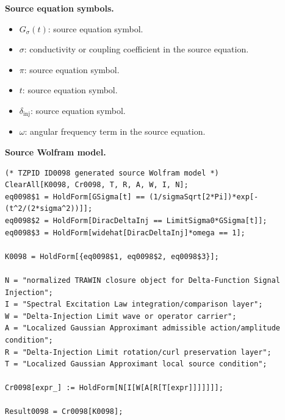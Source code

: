 \begin{minipage}[t]{0.49\linewidth}
\begingroup
\small
\raggedright
\textbf{Source equation symbols.}\par
\begin{itemize}[leftmargin=1.35em,itemsep=1pt,topsep=1pt,parsep=0pt]
    \item $G_{\sigma}(t)$: source equation symbol.
    \item $\sigma$: conductivity or coupling coefficient in the source equation.
    \item $\pi$: source equation symbol.
    \item $t$: source equation symbol.
    \item $\delta_{\mathrm{inj}}$: source equation symbol.
    \item $\omega$: angular frequency term in the source equation.
\end{itemize}
\endgroup
\end{minipage}\hfill
\begin{minipage}[t]{0.47\linewidth}
\begingroup
\scriptsize
\raggedright
\textbf{Source Wolfram model.}\par
\begin{Verbatim}[fontsize=\tiny,breaklines=true,breakanywhere=true]
(* TZPID ID0098 generated source Wolfram model *)
ClearAll[K0098, Cr0098, T, R, A, W, I, N];
eq0098$1 = HoldForm[GSigma[t] == (1/sigmaSqrt[2*Pi])*exp[-(t^2/(2*sigma^2))]];
eq0098$2 = HoldForm[DiracDeltaInj == LimitSigma0*GSigma[t]];
eq0098$3 = HoldForm[widehat[DiracDeltaInj]*omega == 1];

K0098 = HoldForm[{eq0098$1, eq0098$2, eq0098$3}];

N = "normalized TRAWIN closure object for Delta-Function Signal Injection";
I = "Spectral Excitation Law integration/comparison layer";
W = "Delta-Injection Limit wave or operator carrier";
A = "Localized Gaussian Approximant admissible action/amplitude condition";
R = "Delta-Injection Limit rotation/curl preservation layer";
T = "Localized Gaussian Approximant local source condition";

Cr0098[expr_] := HoldForm[N[I[W[A[R[T[expr]]]]]]];

Result0098 = Cr0098[K0098];
\end{Verbatim}
\endgroup
\end{minipage}

